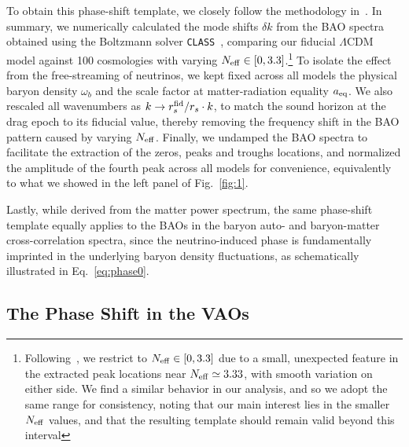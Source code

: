 \documentclass[floats,floatfix,showpacs,amssymb,prd,twocolumn,superscriptaddress,nofootinbib,reprint,preprintnumbers]{revtex4-2}
\begin{document}
To obtain this phase-shift template, we closely follow the methodology in~\cite{Baumann:2017gkg}. In summary, we numerically calculated the mode shifts $\delta k$ from the BAO spectra obtained using the Boltzmann solver \texttt{CLASS}~\cite{Blas:2011rf}, comparing our fiducial $\Lambda$CDM model against 100 cosmologies with varying  $N_{\rm eff} \in [0, 3.3]$.\footnote{Following~\cite{Baumann:2017gkg,Baumann:2019keh}, we restrict to $N_{\rm eff} \in [0,3.3]$ due to a small, unexpected feature in the extracted peak locations near $N_{\rm eff} \simeq 3.33$, with smooth variation on either side. We find a similar behavior in our analysis, and so we adopt the same range for consistency, noting that our main interest lies in the smaller $N_{\rm eff}$ values, and that the resulting template should remain valid beyond this interval} To isolate the effect from the free-streaming of neutrinos, we kept fixed across all models the physical baryon density $\omega_b$ and the scale factor at matter-radiation
equality $a_{\rm eq}$. We also rescaled all wavenumbers as $k \to r_s^{\rm fid}/r_s \cdot k$, to match the sound horizon at the drag epoch to its fiducial value, thereby removing the frequency shift in the BAO pattern caused by varying $N_{\rm eff}$. Finally, we undamped the BAO spectra to facilitate the extraction of the zeros, peaks and troughs locations, and normalized the amplitude of the fourth peak across all models for convenience,  equivalently to
what we showed in the left panel of Fig.~\ref{fig:1}.

Lastly, while derived from the matter power spectrum, the same phase-shift template equally applies to the BAOs in the baryon auto- and baryon-matter cross-correlation spectra, since the neutrino-induced phase is fundamentally imprinted in the underlying baryon density fluctuations, as schematically illustrated in Eq.~\eqref{eq:phase0}.
\subsection{The Phase Shift in the VAOs}\label{sec:phase_vao}
\end{document}
